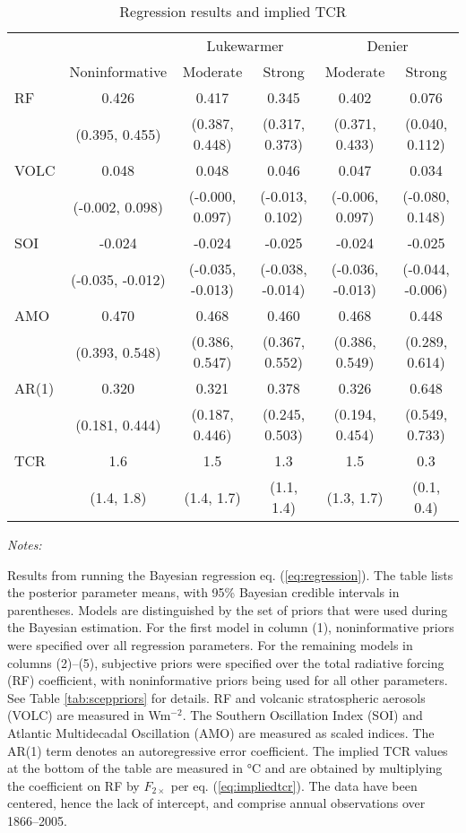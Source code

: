 \documentclass[smallextended]{svjour3}       %
\begin{document}
\begin{table}

\caption{\label{tab:regtab}Regression results and implied TCR \label{tab:reg}}
\centering
\fontsize{8}{10}\selectfont
\begin{threeparttable}
\begin{tabular}[t]{lccccc}
\toprule
\multicolumn{2}{c}{ } & \multicolumn{2}{c}{Lukewarmer} & \multicolumn{2}{c}{Denier} \\
\cmidrule(l{3pt}r{3pt}){3-4} \cmidrule(l{3pt}r{3pt}){5-6}
 & Noninformative & Moderate & Strong & Moderate & Strong\\
\midrule
RF & 0.426 & 0.417 & 0.345 & 0.402 & 0.076\\
 & (0.395, 0.455) & (0.387, 0.448) & (0.317, 0.373) & (0.371, 0.433) & (0.040, 0.112)\\
VOLC & 0.048 & 0.048 & 0.046 & 0.047 & 0.034\\
 & (-0.002, 0.098) & (-0.000, 0.097) & (-0.013, 0.102) & (-0.006, 0.097) & (-0.080, 0.148)\\
SOI & -0.024 & -0.024 & -0.025 & -0.024 & -0.025\\
\addlinespace
 & (-0.035, -0.012) & (-0.035, -0.013) & (-0.038, -0.014) & (-0.036, -0.013) & (-0.044, -0.006)\\
AMO & 0.470 & 0.468 & 0.460 & 0.468 & 0.448\\
 & (0.393, 0.548) & (0.386, 0.547) & (0.367, 0.552) & (0.386, 0.549) & (0.289, 0.614)\\
\midrule
AR(1) & 0.320 & 0.321 & 0.378 & 0.326 & 0.648\\
 & (0.181, 0.444) & (0.187, 0.446) & (0.245, 0.503) & (0.194, 0.454) & (0.549, 0.733)\\
\midrule
\addlinespace
TCR & 1.6 & 1.5 & 1.3 & 1.5 & 0.3\\
 & (1.4, 1.8) & (1.4, 1.7) & (1.1, 1.4) & (1.3, 1.7) & (0.1, 0.4)\\
\bottomrule
\end{tabular}
\begin{tablenotes}[para]
\item \textit{Notes:} 
\item Results from running the Bayesian regression eq. (\ref{eq:regression}). The table lists the posterior parameter means, with 95\% Bayesian credible intervals in parentheses. Models are distinguished by the set of priors that were used during the Bayesian estimation. For the first model in column (1), noninformative priors were specified over all regression parameters. For the remaining models in columns (2)--(5), subjective priors were specified over the total radiative forcing (RF) coefficient, with noninformative priors being used for all other parameters. See Table \ref{tab:sceppriors} for details. RF and volcanic stratospheric aerosols (VOLC) are measured in Wm$^{-2}$. The Southern Oscillation Index (SOI) and Atlantic Multidecadal Oscillation (AMO) are measured as scaled indices. The AR(1) term denotes an autoregressive error coefficient. The implied TCR values at the bottom of the table are measured in °C and are obtained by multiplying the coefficient on RF by $F_{2\times}$ per eq. (\ref{eq:impliedtcr}). The data have been centered, hence the lack of intercept, and comprise annual observations over 1866--2005.

\end{tablenotes}
\end{threeparttable}
\end{table}
\end{document}
